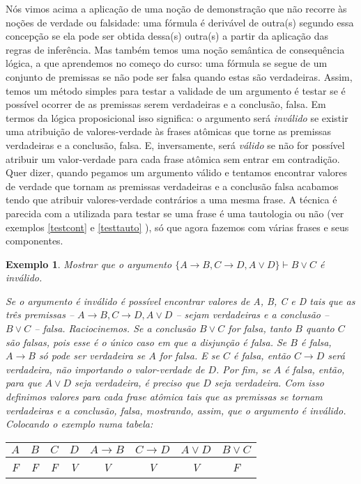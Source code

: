 \documentclass[a4paper,10pt]{article}
\newtheorem{exmpl}{Exemplo}[subsection] %
\begin{document}
Nós vimos acima a aplicação de uma noção de demonstração que não recorre às noções de
verdade ou falsidade: uma fórmula é derivável de outra(s) segundo essa concepção se ela
pode ser obtida dessa(s) outra(s) a partir da aplicação das regras de inferência. Mas
também temos uma noção semântica de consequência lógica, a que aprendemos no começo do
curso: uma fórmula se segue de um conjunto de premissas se não pode ser falsa quando
estas são verdadeiras. Assim, temos um método simples para testar a validade de um
argumento é testar se é possível ocorrer de as premissas serem verdadeiras e a
conclusão, falsa. Em termos da lógica proposicional isso significa: o argumento será
\emph{inválido} se existir uma atribuição de valores-verdade às frases atômicas que
torne as premissas verdadeiras e a conclusão, falsa. E, inversamente, será
\emph{válido} se não for possível atribuir um valor-verdade para cada frase atômica sem
entrar em contradição. Quer dizer, quando pegamos um argumento válido e tentamos
encontrar valores de verdade que tornam as premissas verdadeiras e a conclusão falsa
acabamos tendo que atribuir valores-verdade contrários a uma mesma frase. A técnica é
parecida com a utilizada para testar se uma frase é uma tautologia ou não (ver exemplos
\ref{testcont} e \ref{testtauto} ), só que agora fazemos com várias frases e seus
componentes.

\begin{exmpl}
Mostrar que o argumento $\{A\rightarrow{}B, C\rightarrow{}D,
A\vee{}D\}\vdash{}B\vee{}C$ é inválido.

Se o argumento é inválido é possível encontrar valores de A, B, C e D tais que as três
premissas -- $A\rightarrow{}B, C\rightarrow{}D,
A\vee{}D$ -- sejam verdadeiras e a conclusão -- $B\vee{}C$ -- falsa. Raciocinemos. Se a
conclusão $B\vee{}C$ for falsa, tanto $B$ quanto $C$ são falsas, pois esse é o único
caso em que a disjunção é falsa. Se $B$ é falsa, $A\rightarrow{}B$ só pode ser
verdadeira se $A$ for falsa. E se $C$ é falsa, então $C\rightarrow{}D$ será
verdadeira, não importando o valor-verdade de $D$. Por fim, se $A$ é falsa, então, para que
$A\vee{}D$ seja verdadeira, é preciso que $D$ seja verdadeira. Com isso definimos valores para 
cada frase atômica tais que as premissas se tornam verdadeiras e a conclusão, falsa, mostrando, 
assim, que o argumento é inválido. Colocando o exemplo numa tabela:

\begin{center}
\begin{tabular}[c]{cccccccc}
$A$ & $B$ & $C$ & $D$ & $A\rightarrow{}B$ & $C\rightarrow{}D$ & $A\vee{}D$ & $B\vee{}C$
\\
\hline
F	&	F	&	F	& V &	V	&	V	&
V	&	F

\end{tabular}
\end{center}


\end{exmpl}
\end{document}
